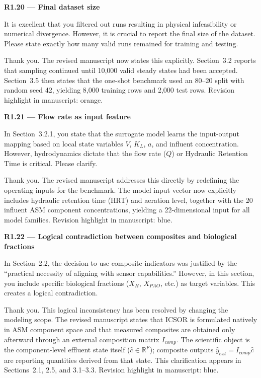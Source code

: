 \documentclass[a4paper,11pt]{article}
\newcommand{\reviewlabel}[1]{\noindent\textbf{\textcolor{accentblue}{#1}}\par\medskip}
\newcommand{\revhighlight}[2]{\textcolor{#1}{Revision highlight in manuscript: #2.}}
\begin{document}
\reviewlabel{R1.20 --- Final dataset size}
\begin{reviewbox}
It is excellent that you filtered out runs resulting in physical infeasibility or numerical divergence. However, it is crucial to report the final size of the dataset. Please state exactly how many valid runs remained for training and testing.
\end{reviewbox}

Thank you. The revised manuscript now states this explicitly. Section~3.2 reports that sampling continued until 10,000 valid steady states had been accepted. Section~3.5 then states that the one-shot benchmark used an 80--20 split with random seed 42, yielding 8,000 training rows and 2,000 test rows. \revhighlight{revRoneSixteen}{orange}

\reviewlabel{R1.21 --- Flow rate as input feature}
\begin{reviewbox}
In Section~3.2.1, you state that the surrogate model learns the input-output mapping based on local state variables $V$, $K_L$, $a$, and influent concentration. However, hydrodynamics dictate that the flow rate ($Q$) or Hydraulic Retention Time is critical. Please clarify.
\end{reviewbox}

Thank you. The revised manuscript addresses this directly by redefining the operating inputs for the benchmark. The model input vector now explicitly includes hydraulic retention time (HRT) and aeration level, together with the 20 influent ASM component concentrations, yielding a 22-dimensional input for all model families. \revhighlight{revDefault}{blue}

\reviewlabel{R1.22 --- Logical contradiction between composites and biological fractions}
\begin{reviewbox}
In Section~2.2, the decision to use composite indicators was justified by the ``practical necessity of aligning with sensor capabilities.'' However, in this section, you include specific biological fractions ($X_H$, $X_{PAO}$, etc.) as target variables. This creates a logical contradiction.
\end{reviewbox}

Thank you. This logical inconsistency has been resolved by changing the modeling scope. The revised manuscript states that ICSOR is formulated natively in ASM component space and that measured composites are obtained only afterward through an external composition matrix $I_{comp}$. The scientific object is the component-level effluent state itself ($\hat{c} \in \mathbb{R}^{F}$); composite outputs $\hat{y}_{ext} = I_{comp}\hat{c}$ are reporting quantities derived from that state. This clarification appears in Sections~2.1, 2.5, and 3.1--3.3. \revhighlight{revDefault}{blue}
\end{document}
